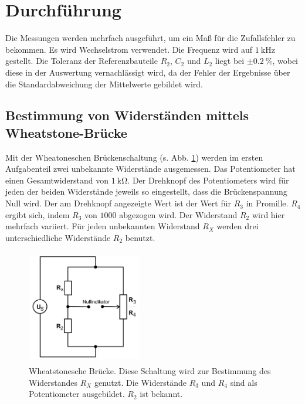 \section{Durchführung}
\label{sec:Durchführung}

Die Messungen werden mehrfach ausgeführt, um ein Maß für die Zufallsfehler zu bekommen.
Es wird Wechselstrom verwendet. Die Frequenz wird auf $\SI{1}{\kilo\hertz}$ gestellt.
Die Toleranz der Referenzbauteile $R_2$, $C_2$ und $L_2$ liegt bei $\pm \SI{0.2}{\percent}$, wobei diese in der Auswertung vernachlässigt wird, da der Fehler der Ergebnisse über die Standardabweichung der Mittelwerte gebildet wird.

\subsection{Bestimmung von Widerständen mittels Wheatstone-Brücke}
Mit der Wheatoneschen Brückenschaltung (s. Abb. \ref{wheatstone}) werden im ersten Aufgabenteil zwei unbekannte Widerstände ausgemessen.
Das Potentiometer hat einen Gesamtwiderstand von $\SI{1}{\kilo\ohm}$.
Der Drehknopf des Potentiometers wird für jeden der beiden Widerstände 
jeweils so eingestellt, dass die Brückenspannung Null wird. 
Der am Drehknopf angezeigte Wert ist der Wert für $R_3$ in Promille. 
$R_4$ ergibt sich, indem $R_3$ von $\num{1000}$ abgezogen wird.
Der Widerstand $R_2$ wird hier mehrfach variiert. Für jeden unbekannten Widerstand $R_X$
werden drei unterschiedliche Widerstände $R_2$ benutzt.
\begin{figure}
    \centering
    \includegraphics[width=5cm, height=5cm]{build/wheatstone.png}
    \caption{Wheatstonesche Brücke. Diese Schaltung wird zur Bestimmung
    des Widerstandes $R_X$ genutzt. Die Widerstände $R_3$ und $R_4$
    sind als Potentiometer ausgebildet. $R_2$ ist bekannt.}%
    \label{wheatstone}
\end{figure}


